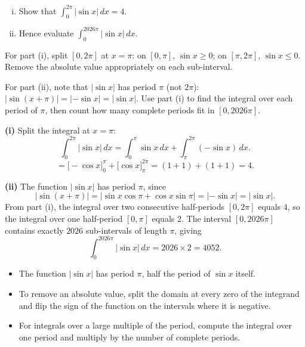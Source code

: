 \begin{problem}
\begin{enumerate}[(i)]
  \item Show that $\displaystyle\int_0^{2\pi} |\sin x|\,dx = 4$.
  \item Hence evaluate $\displaystyle\int_0^{2026\pi} |\sin x|\,dx$.
\end{enumerate}
\end{problem}

\begin{hintbox}
For part (i), split $[0, 2\pi]$ at $x = \pi$: on $[0,\pi]$, $\sin x \ge 0$; on $[\pi, 2\pi]$,
$\sin x \le 0$.  Remove the absolute value appropriately on each sub-interval.

For part (ii), note that $|\sin x|$ has period $\pi$ (not $2\pi$):
$|\sin(x+\pi)| = |-\sin x| = |\sin x|$.  Use part (i) to find the integral over each period
of $\pi$, then count how many complete periods fit in $[0, 2026\pi]$.
\end{hintbox}

\begin{solution}
\textbf{(i)} Split the integral at $x = \pi$:
\[
\int_0^{2\pi}|\sin x|\,dx
= \int_0^{\pi}\sin x\,dx + \int_{\pi}^{2\pi}(-\sin x)\,dx.
\]
\[
= \bigl[-\cos x\bigr]_0^{\pi} + \bigl[\cos x\bigr]_{\pi}^{2\pi}
= (1+1) + (1+1) = 4.
\]

\textbf{(ii)} The function $|\sin x|$ has period $\pi$, since
\[
|\sin(x+\pi)| = |\sin x\cos\pi + \cos x\sin\pi| = |-\sin x| = |\sin x|.
\]
From part (i), the integral over two consecutive half-periods $[0,2\pi]$ equals $4$, so the
integral over one half-period $[0,\pi]$ equals $2$.  The interval $[0, 2026\pi]$ contains
exactly $2026$ sub-intervals of length $\pi$, giving
\[
\int_0^{2026\pi}|\sin x|\,dx = 2026 \times 2 = \boxed{4052}.
\]
\end{solution}

\begin{takeaways}
\begin{itemize}[leftmargin=*]
  \item The function $|\sin x|$ has period $\pi$, half the period of $\sin x$ itself.
  \item To remove an absolute value, split the domain at every zero of the integrand and flip
        the sign of the function on the intervals where it is negative.
  \item For integrals over a large multiple of the period, compute the integral over one period
        and multiply by the number of complete periods.
\end{itemize}
\end{takeaways}

